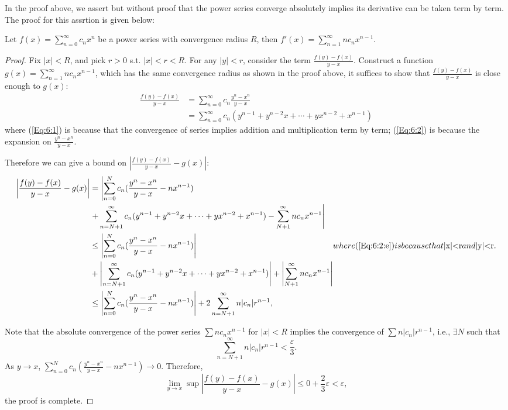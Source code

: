 In the proof above, we assert but without proof that the power series converge absolutely implies its derivative can be taken term by term. The proof for this assrtion is given below:
\begin{proposition}
Let $f(x)=\sum_{n=0}^\infty c_nx^n$ be a power series with convergence radius $R$, then $f'(x)=\sum_{n=1}^\infty nc_nx^{n-1}$.
\end{proposition}
\begin{proof}
Fix $|x|<R$, and pick $r>0$ s.t. $|x|<r<R$. For any $|y|<r$, consider the term $\frac{f(y)-f(x)}{y-x}$. Construct a function $g(x)=\sum_{n=1}^\infty nc_nx^{n-1}$, which has the same convergence radius as shown in the proof above, it suffices to show that $\frac{f(y)-f(x)}{y-x}$ is close enough to $g(x)$:
\begin{subequations}
\begin{align}
\frac{f(y)-f(x)}{y-x}&=\sum_{n=0}^\infty c_n\frac{y^n-x^n}{y-x}\label{Eq:6:1}\\
&=\sum_{n=0}^\infty c_n(y^{n-1}+y^{n-2}x+\cdots+yx^{n-2}+x^{n-1})\label{Eq:6:2}
\end{align}
\end{subequations}
where (\ref{Eq:6:1}) is because that the convergence of series implies addition and multiplication term by term; (\ref{Eq:6:2}) is because the expansion on $\frac{y^n-x^n}{y-x}$.

Therefore we can give a bound on $|\frac{f(y)-f(x)}{y-x}-g(x)|$:
\begin{subequations}
\begin{align}
\left|\frac{f(y)-f(x)}{y-x}-g(x)\right|&=\left|\sum_{n=0}^Nc_n(\frac{y^n-x^n}{y-x} - nx^{n-1})\right.\\& \left.+ \sum_{n=N+1}^\infty c_n(y^{n-1}+y^{n-2}x+\cdots+yx^{n-2}+x^{n-1})-\sum_{N+1}^\infty nc_nx^{n-1}\right|\\
&\le
\left|\sum_{n=0}^Nc_n(\frac{y^n-x^n}{y-x} - nx^{n-1})\right|\\
&+
\left|\sum_{n=N+1}^\infty c_n(y^{n-1}+y^{n-2}x+\cdots+yx^{n-2}+x^{n-1})\right|+\left|\sum_{N+1}^\infty nc_nx^{n-1}\right|\\
&\le
\left|\sum_{n=0}^Nc_n(\frac{y^n-x^n}{y-x} - nx^{n-1})\right|
+
2\sum_{n=N+1}^\infty n|c_n|r^{n-1},\label{Eq:6:2:e}
\end{align}
where (\ref{Eq:6:2:e}) is because that $|x|<r$ and $|y|<r$.
\end{subequations}

Note that the absolute convergence of the power series $\sum nc_n x^{n-1}$ for $|x|<R$ implies the convergence of $\sum n|c_n|r^{n-1}$, i.e., $\exists N$ such that
\[
\sum_{n=N+1}^\infty n|c_n|r^{n-1}<\frac{\varepsilon}{3}.
\]
As $y\to x$, $\sum_{n=0}^Nc_n(\frac{y^n-x^n}{y-x} - nx^{n-1})\to0$. Therefore,
\[
\lim_{y\to x}\sup\left|\frac{f(y)-f(x)}{y-x}-g(x)\right|\le0+\frac{2}{3}\varepsilon<\varepsilon,
\]
the proof is complete.
\end{proof}
